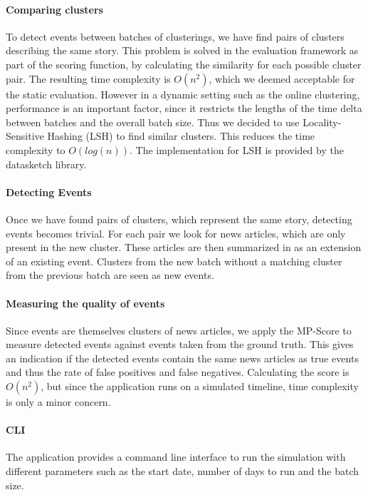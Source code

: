 \paragraph{Comparing clusters}
To detect events between batches of clusterings,
we have find pairs of clusters describing the same story.
This problem is solved in the evaluation framework as part of the scoring function,
by calculating the similarity for each possible cluster pair.
The resulting time complexity is $O(n^2)$, which we deemed acceptable for the static evaluation.
However in a dynamic setting such as the online clustering, performance is an important factor,
since it restricts the lengths of the time delta between batches and the overall batch size.
Thus we decided to use Locality-Sensitive Hashing (LSH)\cite{alex2015practical} to find similar clusters.
This reduces the time complexity to $O(log(n))$.
The implementation for LSH is provided by the datasketch library\cite{eric_zhu_2017_290602}.


\paragraph{Detecting Events}
Once we have found pairs of clusters, which represent the same story, detecting events becomes trivial.
For each pair we look for news articles, which are only present in the new cluster.
These articles are then summarized in as an extension of an existing event.
Clusters from the new batch without a matching cluster from the previous batch
are seen as new events.

\paragraph{Measuring the quality of events} 
Since events are themselves clusters of news articles, we apply the MP-Score to measure detected events against events taken from the ground truth. This gives an indication if the detected events contain the same news articles as true events and thus the rate of false positives and false negatives. Calculating the score is $O(n^2)$, but since the application runs on a simulated timeline, time complexity is only a minor concern. 

\paragraph{CLI} The application provides a command line interface to run the simulation with different parameters such as the start date, number of days to run and the batch size.

